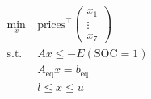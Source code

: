 \documentclass[preview]{standalone}
\begin{document}
\begin{align*}
\begin{aligned}\min_{x} &\ \text{prices}^\top \begin{pmatrix} x_1\\ \vdots\\ x_7 \end{pmatrix} \\\text{s.t.} &\ Ax \leq -E\left(\text{SOC}=1\right) \\&\ A_\text{eq} x = b_\text{eq} \\&\ l \leq x \leq u \end{aligned}
\end{align*}
\end{document}
